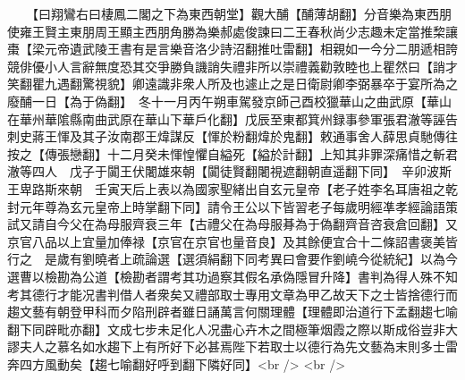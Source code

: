 　　【曰翔鸞右曰棲鳳二閣之下為東西朝堂】觀大酺【酺薄胡翻】分音樂為東西朋使雍王賢主東朋周王顯主西朋角勝為樂郝處俊諫曰二王春秋尚少志趣未定當推棃讓棗【梁元帝遺武陵王書有是言樂音洛少詩沼翻推吐雷翻】相親如一今分二朋遞相誇競俳優小人言辭無度恐其交爭勝負譏誚失禮非所以崇禮義勸敦睦也上瞿然曰【誚才笑翻瞿九遇翻驚視貌】卿遠識非衆人所及也遽止之是日衛尉卿李弼暴卒于宴所為之廢酺一日【為于偽翻】　冬十一月丙午朔車駕發京師己酉校獵華山之曲武原【華山在華州華隂縣南曲武原在華山下華戶化翻】戊辰至東都箕州録事參軍張君澈等誣告刺史蔣王惲及其子汝南郡王煒謀反【惲於粉翻煒於鬼翻】敕通事舍人薛思貞馳傳往按之【傳張戀翻】十二月癸未惲惶懼自縊死【縊於計翻】上知其非罪深痛惜之斬君澈等四人　戊子于闐王伏闍雄來朝【闐徒賢翻闍視遮翻朝直遥翻下同】　辛卯波斯王卑路斯來朝　壬寅天后上表以為國家聖緒出自玄元皇帝【老子姓李名耳唐祖之乾封元年尊為玄元皇帝上時掌翻下同】請令王公以下皆習老子每歲明經凖孝經論語策試又請自今父在為母服齊衰三年【古禮父在為母服朞為于偽翻齊音咨衰倉回翻】又京官八品以上宜量加俸禄【京官在京官也量音良】及其餘便宜合十二條詔書褒美皆行之　是歲有劉曉者上疏論選【選須絹翻下同考異曰會要作劉嶢今從統紀】以為今選曹以檢勘為公道【檢勘者謂考其功過察其假名承偽隱冒升降】書判為得人殊不知考其德行才能况書判借人者衆矣又禮部取士專用文章為甲乙故天下之士皆捨德行而趨文藝有朝登甲科而夕陷刑辟者雖日誦萬言何關理體【理體即治道行下孟翻趨七喻翻下同辟毗亦翻】文成七步未足化人况盡心卉木之間極筆烟霞之際以斯成俗豈非大謬夫人之慕名如水趨下上有所好下必甚焉陛下若取士以德行為先文藝為末則多士雷奔四方風動矣【趨七喻翻好呼到翻下隣好同】<br />
<br />
